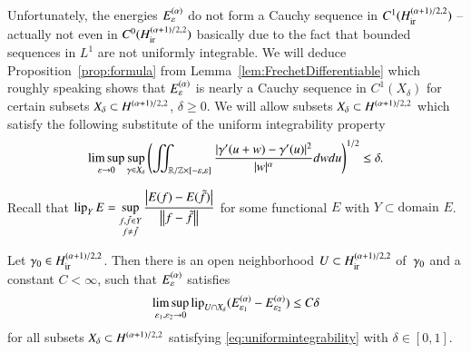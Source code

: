 Unfortunately, the energies $\Ee$ do not form a Cauchy sequence
in $C^1(\Wir)$ -- actually not even in $C^0(\Wir)$ basically due to the fact that bounded sequences in $L^1$ are not uniformly integrable. 
We will deduce Proposition~\ref{prop:formula} from Lemma~\ref{lem:FrechetDifferentiable}
which roughly speaking shows that $\Ee$ is nearly a Cauchy sequence 
in $C^1(X_{\delta})$ for certain subsets $X_\delta \subset \W[(\alpha +1)/2,2]$, $\delta\ge0$. 
We will allow subsets $X_\delta  \subset \W[(\alpha +1)/2,2]$ which satisfy
the following substitute of the uniform integrability property
\begin{equation} \label{eq:uniformintegrability}
 \limsup_{\varepsilon \rightarrow 0}\sup_{\gamma \in X_\delta} 
  \left(\iint_{\mathbb R / \mathbb Z \times [-\eps, \eps]}
  \frac {|\gamma'(u+w) - \gamma'(u)|^2}{|w|^\alpha} dw du \right) ^{1/2}
\leq \delta.
\end{equation}

Recall that $\displaystyle\lip_Y E = \sup_{\substack{f,\tilde f\in Y\\f\ne\tilde f}}\frac{\abs{E(f)-E(\tilde f)}}{\norm{f-\tilde f}}$
for some functional $E$ with $Y\subset\textrm{domain } E$.

\begin{lemma} \label{lem:CauchySequence}
 Let $\gamma_0 \in \Wir$. Then there is an open neighborhood $U \subset \Wir$ of~$\g_0$
 and a constant $C < \infty$, such that 
 $\Ee$ satisfies
\begin{gather}
      \limsup_{\varepsilon_1, \varepsilon_2 \rightarrow 0}\lip_{U \cap X_\delta} (\E_{\eps_1} - \E_{\eps_2})
      \le C \delta\label{eq:CauchySequence2}
\end{gather}
for all subsets $X_\delta \subset \W$ satisfying \eqref{eq:uniformintegrability}
with $\delta \in[0,1]$.
\end{lemma}

